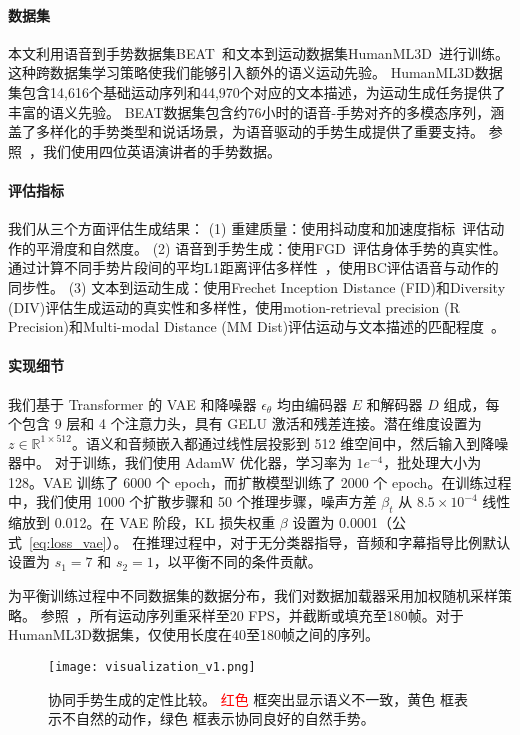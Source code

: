 \paragraph{数据集}
本文利用语音到手势数据集BEAT~\cite{liu2022beat}和文本到运动数据集HumanML3D~\cite{guo2022humanml3d}进行训练。这种跨数据集学习策略使我们能够引入额外的语义运动先验。
HumanML3D数据集包含14,616个基础运动序列和44,970个对应的文本描述，为运动生成任务提供了丰富的语义先验。
BEAT数据集包含约76小时的语音-手势对齐的多模态序列，涵盖了多样化的手势类型和说话场景，为语音驱动的手势生成提供了重要支持。
参照~\cite{liu2022beat}，我们使用四位英语演讲者的手势数据。

\paragraph{评估指标}
我们从三个方面评估生成结果：
(1) 重建质量：使用抖动度和加速度指标~\cite{kucherenko2019analyzing}评估动作的平滑度和自然度。
(2) 语音到手势生成：使用FGD~\cite{yoon2020speech}评估身体手势的真实性。通过计算不同手势片段间的平均L1距离评估多样性~\cite{liu2024emage}，使用BC评估语音与动作的同步性。
(3) 文本到运动生成：使用Frechet Inception Distance (FID)和Diversity (DIV)评估生成运动的真实性和多样性，使用motion-retrieval precision (R Precision)和Multi-modal Distance (MM Dist)评估运动与文本描述的匹配程度~\cite{chen2023executing}。

\paragraph{实现细节}
我们基于 Transformer 的 VAE 和降噪器 $\epsilon_\theta$ 均由编码器 $E$ 和解码器 $D$ 组成，每个包含 9 层和 4 个注意力头，具有 GELU 激活和残差连接。潜在维度设置为 $z \in \mathbb{R}^{1 \times 512}$。语义和音频嵌入都通过线性层投影到 512 维空间中，然后输入到降噪器中。
对于训练，我们使用 AdamW 优化器，学习率为 $1e^{-4}$，批处理大小为 128。VAE 训练了 6000 个 epoch，而扩散模型训练了 2000 个 epoch。在训练过程中，我们使用 1000 个扩散步骤和 50 个推理步骤，噪声方差 $\beta_t$ 从 $8.5 \times 10^{-4}$ 线性缩放到 0.012。在 VAE 阶段，KL 损失权重 $\beta$ 设置为 0.0001（公式~\ref{eq:loss_vae}）。
在推理过程中，对于无分类器指导，音频和字幕指导比例默认设置为 $s_1=7$ 和 $s_2=1$，以平衡不同的条件贡献。

为平衡训练过程中不同数据集的数据分布，我们对数据加载器采用加权随机采样策略。
参照~\cite{yang2024freetalker}，所有运动序列重采样至20 FPS，并截断或填充至180帧。对于HumanML3D数据集，仅使用长度在40至180帧之间的序列。

\begin{figure*}[t]
  \centering
  \texttt{[image: visualization\_v1.png]}
  \caption{协同手势生成的定性比较。 \textcolor{red}{红色} 框突出显示语义不一致，\textcolor[RGB]{204,153,0}{黄色} 框表示不自然的动作，\textcolor[RGB]{34,139,34}{绿色} 框表示协同良好的自然手势。}
  \label{fig:method:visualization}
\end{figure*}



